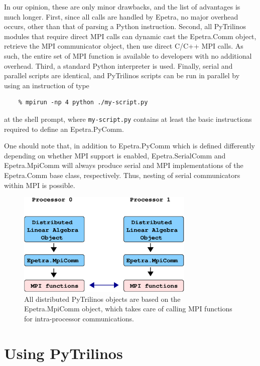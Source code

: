 \documentclass[acmtocl]{acmtrans2m}
\begin{document}
In our opinion, these are only minor drawbacks, and the list of
advantages is much longer. First, since all calls are handled by
Epetra, no major overhead occurs, other than that of parsing a
Python instruction. Second, all PyTrilinos modules that require
direct MPI calls can dynamic cast the Epetra.Comm object, retrieve
the MPI communicator object, then use direct C/C++ MPI calls. As
such, the entire set of MPI function is available to developers with
no additional overhead. Third, a standard Python interpreter is
used. Finally, serial and parallel scripts are identical, and
 PyTrilinos scripts can be run in parallel
by using an instruction of type
\begin{verbatim}
    % mpirun -np 4 python ./my-script.py
\end{verbatim}
at the shell prompt, where {\tt my-script.py} contains at least the basic
instructions required to define an Epetra.PyComm.

One should note that, in addition to Epetra.PyComm which is defined
differently depending on whether MPI support is enabled,
Epetra.SerialComm and Epetra.MpiComm will always produce serial and
MPI implementations of the Epetra.Comm base class, respectively.
Thus, nesting of serial communicators within MPI is possible.

\begin{figure}
\begin{center}
\includegraphics[height=5cm]{distributed_object.eps}
\caption{All distributed PyTrilinos objects are based on the Epetra.MpiComm
  object, which takes care of calling MPI functions for intra-processor
    communications.}
\label{fig:distributed}
\end{center}
\end{figure}


\section{Using PyTrilinos}
\label{sec:using}
\end{document}

